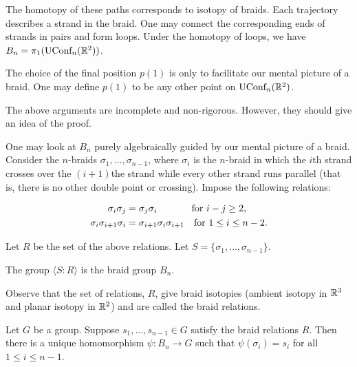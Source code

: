 The homotopy of these paths corresponds to isotopy of braids. Each trajectory describes a strand in the braid. One may connect the corresponding ends of strands in pairs and form loops. Under the homotopy of loops, we have $B_n = \pi_1(\text{UConf}_n(\mathbb{R}^2))$.

\begin{remark}
\label{sec:artin-braid-group-3}
The choice of the final position $p(1)$ is only to facilitate our mental picture of a braid. One may define $p(1)$ to be any other point on $\text{UConf}_n(\mathbb{R}^2)$.
\end{remark}

\begin{remark}
The above arguments are incomplete and non-rigorous. However, they should give an idea of the proof.
\end{remark}

One may look at $B_n$ purely algebraically guided by our mental picture of a braid. Consider the $n$-braids $\sigma_1,\ldots, \sigma_{n-1}$, where $\sigma_i$ is the $n$-braid in which the $i$th strand crosses over the $(i+1)$the strand while every other strand runs parallel (that is, there is no other double point or crossing). Impose the following relations:

\begin{align}
\label{eq:4}
  \sigma_i\sigma_j &= \sigma_j\sigma_i \hspace*{3.6em}\text{for } i-j \geq 2, \\
  \sigma_i\sigma_{i+1}\sigma_i &= \sigma_{i+1}\sigma_i\sigma_{i+1} \hspace*{1em}\text{for } 1 \leq i \leq n-2.
\end{align}

Let $R$ be the set of the above relations. Let $S = \{\sigma_1,\ldots, \sigma_{n-1}\}$. 

\begin{theorem}
\label{sec:artin-braid-group-4}
The group $\langle S : R \rangle$ is the braid group $B_n$.
\end{theorem}

Observe that the set of relations, $R$, give braid isotopies (ambient isotopy in $\mathbb{R}^3$ and planar isotopy in $\mathbb{R}^2$) and are called the braid relations.


\begin{theorem}
\label{sec:artin-braid-group-6}
Let $G$ be a group. Suppose $s_1, \ldots, s_{n-1} \in G$ satisfy the braid relations $R$. Then there is a unique homomorphism $\psi : B_n \to G$ such that $\psi(\sigma_i) = s_i$ for all $1 \leq i \leq n-1$. 
\end{theorem}

